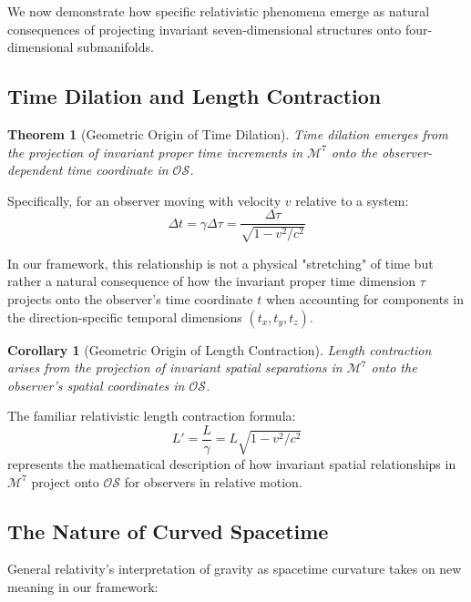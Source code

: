 \documentclass{article}
\newtheorem{theorem}{Theorem}
\newtheorem{corollary}{Corollary}
\begin{document}
We now demonstrate how specific relativistic phenomena emerge as natural consequences of projecting invariant seven-dimensional structures onto four-dimensional submanifolds.

\subsection{Time Dilation and Length Contraction}

\begin{theorem}[Geometric Origin of Time Dilation]
Time dilation emerges from the projection of invariant proper time increments in $\mathcal{M}^7$ onto the observer-dependent time coordinate in $\mathcal{OS}$.
\end{theorem}

Specifically, for an observer moving with velocity $v$ relative to a system:
\begin{equation}
\Delta t = \gamma \Delta \tau = \frac{\Delta \tau}{\sqrt{1-v^2/c^2}}
\end{equation}

In our framework, this relationship is not a physical "stretching" of time but rather a natural consequence of how the invariant proper time dimension $\tau$ projects onto the observer's time coordinate $t$ when accounting for components in the direction-specific temporal dimensions $(t_x, t_y, t_z)$.

\begin{corollary}[Geometric Origin of Length Contraction]
Length contraction arises from the projection of invariant spatial separations in $\mathcal{M}^7$ onto the observer's spatial coordinates in $\mathcal{OS}$.
\end{corollary}

The familiar relativistic length contraction formula:
\begin{equation}
L' = \frac{L}{\gamma} = L\sqrt{1-v^2/c^2}
\end{equation}
represents the mathematical description of how invariant spatial relationships in $\mathcal{M}^7$ project onto $\mathcal{OS}$ for observers in relative motion.

\subsection{The Nature of Curved Spacetime}

General relativity's interpretation of gravity as spacetime curvature takes on new meaning in our framework:
\end{document}
